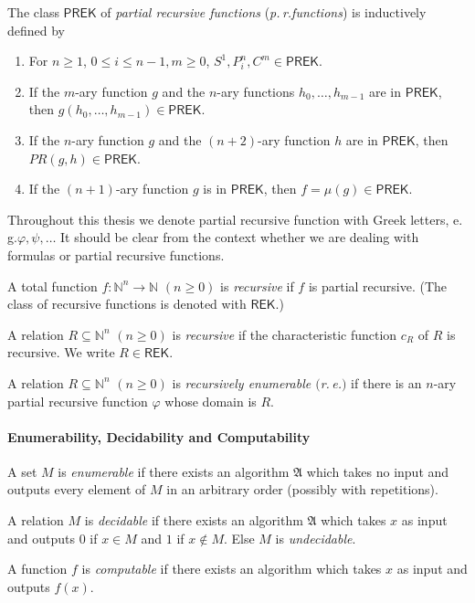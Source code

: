 The class $\mathsf{PREK}$ of \textit{partial recursive functions} (\textit{p.\,r.\@ functions}) is inductively defined by
\begin{enumerate}
\item For $n \ge 1$, $0 \le i \le n-1, m \ge 0$, $S^1, P_i^n, C^m \in \mathsf{PREK}$.
\item If the $m$-ary function $g$ and the $n$-ary functions $h_0, \ldots, h_{m-1} $ are in $\mathsf{PREK}$, then $g(h_0, \ldots, h_{m-1}) \in \mathsf{PREK}$.
\item If the $n$-ary function $g$ and the $(n+2)$-ary function $h$ are in $\mathsf{PREK}$, then $\mathit{PR}(g,h) \in \mathsf{PREK}$.
\item If the $(n+1)$-ary function $g$ is in $\mathsf{PREK}$, then $f = \mu(g) \in \mathsf{PREK}$. 
\end{enumerate}
Throughout this thesis we denote partial recursive function with Greek letters, e.\,g.\@ $\varphi,\psi, \ldots$ It should be clear from the context whether we are dealing with formulas or partial recursive functions.


A total function $f: \mathbb{N}^n \rightarrow \mathbb{N}$ $(n\ge 0 )$ is \textit{recursive} if $f$ is partial recursive. (The class of recursive functions is denoted with $\mathsf{REK}$.)

A relation $R \subseteq \mathbb{N}^n$ $(n \ge 0)$ is \textit{recursive} if the characteristic function $c_R$ of $R$ is recursive. We write $R \in \mathsf{REK}$.

A relation $R \subseteq \mathbb{N}^n$ $(n \ge 0)$ is \textit{recursively enumerable $($r.\,e.$)$} if there is an $n$-ary partial recursive function $\varphi$ whose domain is $R$.



\paragraph{Enumerability, Decidability and Computability}
A set $M$ is \textit{enumerable} if there exists an algorithm $\mathfrak{A}$ which takes no input and outputs every element of $M$ in an arbitrary order (possibly with repetitions).

A relation $M$ is \textit{decidable} if there exists an algorithm $\mathfrak{A}$ which takes $x$ as input and outputs $0$ if $x \in M$ and $1$ if $x \notin M$. Else $M$ is \textit{undecidable}.

A function $f$ is \textit{computable} if there exists an algorithm which takes $x$ as input and outputs $f(x)$.


